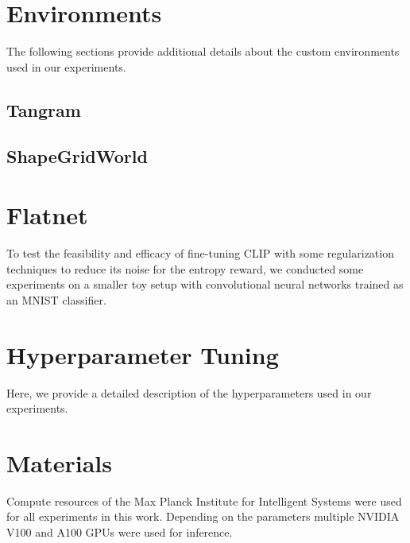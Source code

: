 \chapter{Environments}
The following sections provide additional details about the custom environments used in our experiments.

\section{Tangram}
\label{sec:tangram-details}


\section{ShapeGridWorld}
\label{sec:sgw-details}


\chapter{Flatnet}
\label{sec:flatnet}
To test the feasibility and efficacy of fine-tuning CLIP with some regularization techniques to reduce its noise for the entropy reward, we conducted some experiments on a smaller toy setup with convolutional neural networks trained as an MNIST classifier.


\chapter{Hyperparameter Tuning}
\label{sec:hyperparameters}
Here, we provide a detailed description of the hyperparameters used in our experiments.


\chapter{Materials}
\label{sec:materials}
Compute resources of the Max Planck Institute for Intelligent Systems were used for all experiments in this work.
Depending on the parameters multiple NVIDIA V100 and A100 GPUs were used for inference.
